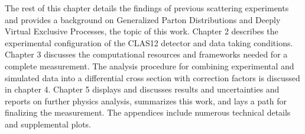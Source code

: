 The rest of this chapter details the findings of previous scattering experiments and provides a background on Generalized Parton Distributions and Deeply Virtual Exclusive Processes, the topic of this work. Chapter 2 describes the experimental configuration of the CLAS12 detector and data taking conditions. Chapter 3 discusses the computational resources and frameworks needed for a complete \xsec measurement. The analysis procedure for combining experimental and simulated data into a differential cross section with correction factors is discussed in chapter 4. Chapter 5 displays and discusses results and uncertainties and reports on further physics analysis, summarizes this work, and lays a path for finalizing the measurement. The appendices include numerous technical details and supplemental plots. 


\clearpage



         
 

